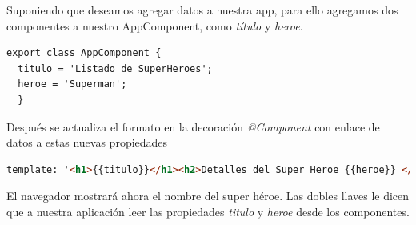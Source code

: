 \documentclass[12pt,twoside]{book}
\begin{document}
Suponiendo que deseamos agregar datos a nuestra app, para ello agregamos dos componentes a nuestro AppComponent, como \textit{título} y \textit{heroe}.


\begin{lstlisting}[language=html]
export class AppComponent {
  titulo = 'Listado de SuperHeroes';
  heroe = 'Superman';
  }
  \end{lstlisting}


Después se actualiza el formato en la decoración \textit{@Component} con enlace de datos a estas nuevas propiedades


\begin{lstlisting}[language=html]
template: '<h1>{{titulo}}</h1><h2>Detalles del Super Heroe {{heroe}} </h2>'
  \end{lstlisting}
  
  El navegador mostrará ahora el nombre del super héroe. Las dobles llaves le dicen que a nuestra aplicación leer las propiedades \textit{titulo} y \textit{heroe} desde los componentes.







\end{document}
